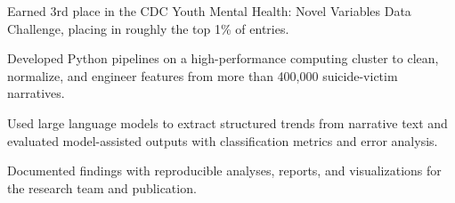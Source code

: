 \begin{bullets}
	\item Earned 3rd place in the CDC Youth Mental Health: Novel Variables Data Challenge, placing in roughly the top 1\% of entries.
	\item Developed Python pipelines on a high-performance computing cluster to clean, normalize, and engineer features from more than 400,000 suicide-victim narratives.
	\item Used large language models to extract structured trends from narrative text and evaluated model-assisted outputs with classification metrics and error analysis.
	\item Documented findings with reproducible analyses, reports, and visualizations for the research team and publication.
\end{bullets}